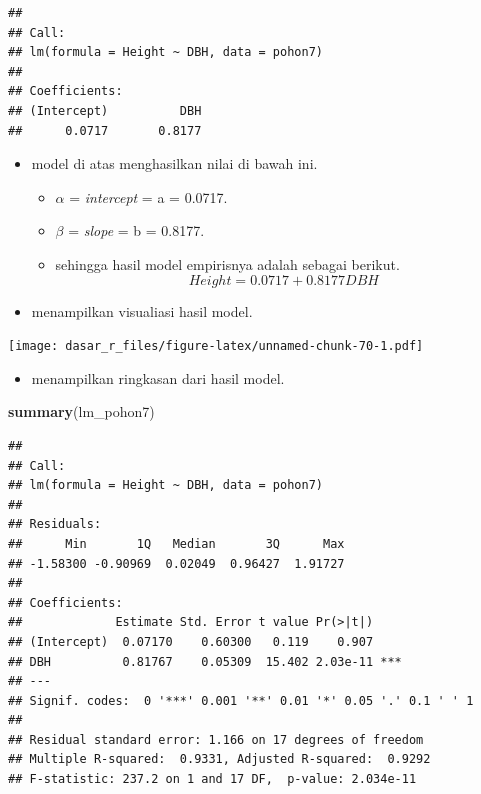 \documentclass[
  12pt,
  a4paper,
]{scrbook}
\newenvironment{Shaded}{\begin{snugshade}}{\end{snugshade}}
\newcommand{\DataTypeTok}[1]{\textcolor[rgb]{0.13,0.29,0.53}{#1}}
\newcommand{\DecValTok}[1]{\textcolor[rgb]{0.00,0.00,0.81}{#1}}
\newcommand{\FloatTok}[1]{\textcolor[rgb]{0.00,0.00,0.81}{#1}}
\newcommand{\KeywordTok}[1]{\textcolor[rgb]{0.13,0.29,0.53}{\textbf{#1}}}
\newcommand{\NormalTok}[1]{#1}
\newcommand{\OperatorTok}[1]{\textcolor[rgb]{0.81,0.36,0.00}{\textbf{#1}}}
\newcommand{\StringTok}[1]{\textcolor[rgb]{0.31,0.60,0.02}{#1}}
\providecommand{\tightlist}{%
  \setlength{\itemsep}{0pt}\setlength{\parskip}{0pt}}
\begin{document}
\begin{verbatim}
## 
## Call:
## lm(formula = Height ~ DBH, data = pohon7)
## 
## Coefficients:
## (Intercept)          DBH  
##      0.0717       0.8177
\end{verbatim}

\begin{itemize}
\tightlist
\item
  model di atas menghasilkan nilai di bawah ini.

  \begin{itemize}
  \tightlist
  \item
    \(\alpha\) = \emph{intercept} = a = 0.0717.
  \item
    \(\beta\) = \emph{slope} = b = 0.8177.
  \item
    sehingga hasil model empirisnya adalah sebagai berikut.
    \[ Height = 0.0717 + 0.8177 DBH \]
  \end{itemize}
\item
  menampilkan visualiasi hasil model.
\end{itemize}

\begin{Shaded}
\end{Shaded}

\texttt{[image: dasar\_r\_files/figure-latex/unnamed-chunk-70-1.pdf]}

\begin{itemize}
\tightlist
\item
  menampilkan ringkasan dari hasil model.
\end{itemize}

\begin{Shaded}
\begin{Highlighting}[]
\KeywordTok{summary}\NormalTok{(lm_pohon7)}
\end{Highlighting}
\end{Shaded}

\begin{verbatim}
## 
## Call:
## lm(formula = Height ~ DBH, data = pohon7)
## 
## Residuals:
##      Min       1Q   Median       3Q      Max 
## -1.58300 -0.90969  0.02049  0.96427  1.91727 
## 
## Coefficients:
##             Estimate Std. Error t value Pr(>|t|)    
## (Intercept)  0.07170    0.60300   0.119    0.907    
## DBH          0.81767    0.05309  15.402 2.03e-11 ***
## ---
## Signif. codes:  0 '***' 0.001 '**' 0.01 '*' 0.05 '.' 0.1 ' ' 1
## 
## Residual standard error: 1.166 on 17 degrees of freedom
## Multiple R-squared:  0.9331, Adjusted R-squared:  0.9292 
## F-statistic: 237.2 on 1 and 17 DF,  p-value: 2.034e-11
\end{verbatim}
\end{document}

